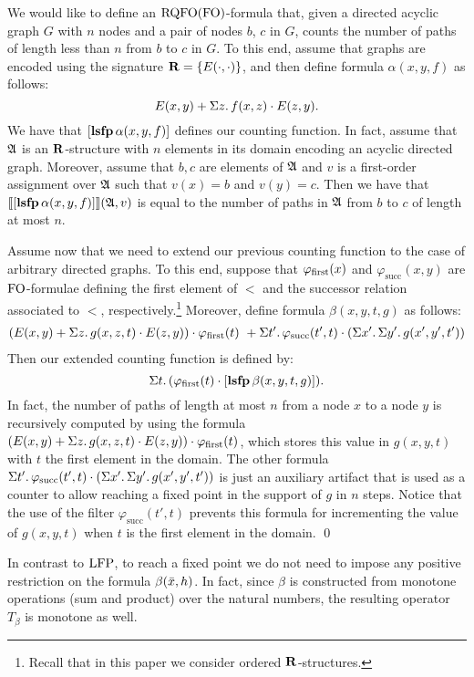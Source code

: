\begin{exa} \label{ex:count-path}
We would like to define an ${\rm RQFO}({\rm FO})$-formula that, given a directed acyclic graph $G$ with $n$ nodes and a pair of nodes $b$, $c$ in $G$, counts the number of paths of length less than $n$ from $b$ to $c$ in $G$. To this end, assume that graphs are encoded using the signature $\mathbf{R} = \{ E(\cdot,\cdot)\}$, and then define formula $\alpha(x, y, f)$ as follows:
$$ 
E(x,y) + \Sigma{z}.\, f(x,z)\cdot E(z,y).
$$
We have that $[{\bf lsfp} \, \alpha(x,y,f)]$ defines our counting function. In fact, assume that $\mathfrak{A}$ is an $\mathbf{R}$-structure with $n$ elements in its domain encoding an acyclic directed graph. Moreover, assume that $b,c$ are elements of $\mathfrak{A}$ and $v$ is a first-order assignment over $\mathfrak{A}$ such that $v(x) = b$ and $v(y) = c$. Then we have that ${\llbracket{}{[{\bf lsfp} \, \alpha(x,y,f)]}\rrbracket}(\mathfrak{A},v)$ is equal to the  number of paths in $\mathfrak{A}$ from $b$ to $c$ of length at most $n$.

Assume now that we need to extend our previous counting function to the case of arbitrary directed graphs. To this end, suppose that $\varphi_{\text{\rm first}}(x)$ and $\varphi_{\text{succ}}(x,y)$ are ${\rm FO}$-formulae defining the first element of $<$ and the successor relation associated to $<$, respectively.\footnote{Recall that in this paper we consider ordered $\mathbf{R}$-structures.} Moreover, define formula $\beta(x, y, t, g)$ as follows:
\begin{align*}
(E(x,y) + \Sigma{z}.\, g(x,z,t)\cdot E(z,y)) \cdot \varphi_{\text{\rm first}}(t) \ +
\Sigma{t'}.\, \varphi_{\text{succ}}(t',t) \cdot \left(\Sigma{x'}.\, \Sigma{y'}.\, g(x',y',t') \right)
\end{align*}
Then our extended counting function is defined by:
$$
\Sigma{t}.\, (\varphi_{\text{\rm first}}(t) \cdot [{\bf lsfp} \, \beta(x,y,t,g)]).
$$ 
In fact, the number of paths of length at most $n$ from a node $x$ to a node $y$ is recursively computed by using the formula $(E(x,y) + \Sigma{z}.\, g(x,z,t)\cdot E(z,y)) \cdot \varphi_{\text{\rm first}}(t)$, which stores this value in $g(x,y,t)$ with $t$ the first element in the domain.  The other formula $\Sigma{t'}.\, \varphi_{\text{succ}}(t',t) \cdot \left(\Sigma{x'}.\, \Sigma{y'}.\, g(x',y',t') \right)$ is just an auxiliary artifact that is used as a counter to allow reaching a fixed point in the support of $g$ in $n$ steps. Notice that the use of the filter $\varphi_{\text{succ}}(t',t)$ prevents this formula for incrementing the value of $g(x,y,t)$ when $t$ is the first element in the domain. \qed
\end{exa}
In contrast to ${\rm LFP}$, to reach a fixed point we do not need to impose any positive restriction on the formula $\beta(\bar{x},h)$.
In fact, since $\beta$ is constructed from monotone operations (sum and product) over the natural numbers, the resulting operator $T_{\beta}$ is monotone as well.

